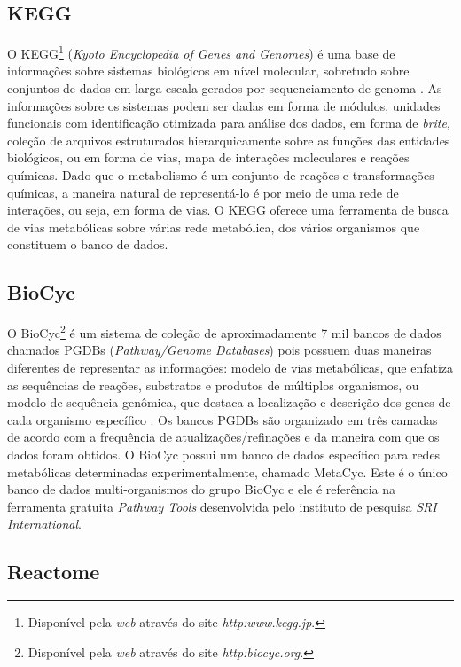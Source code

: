 \subsection{KEGG}

\indent O KEGG\footnote{Disponível pela \textit{web} através do site \textit{http:\/\/www.kegg.jp\/}.} (\textit{Kyoto Encyclopedia of Genes and Genomes}) é uma base de informações sobre sistemas biológicos em nível molecular, sobretudo sobre conjuntos de dados em larga escala gerados por sequenciamento de genoma \cite{keggOverview}. As informações sobre os sistemas podem ser dadas em forma de módulos, unidades funcionais com identificação otimizada para análise dos dados, em forma de \textit{brite}, coleção de arquivos estruturados hierarquicamente sobre as funções das entidades biológicos, ou em forma de vias, mapa de interações moleculares e reações químicas. Dado que o metabolismo é um conjunto de reações e transformações químicas, a maneira natural de representá-lo é por meio de uma rede de interações, ou seja, em forma de vias. O KEGG oferece uma ferramenta de busca de vias metabólicas sobre várias rede metabólica, dos vários organismos que constituem o banco de dados.

\subsection{BioCyc}

\indent O BioCyc\footnote{Disponível pela \textit{web} através do site \textit{http:\/\/biocyc.org}.} é um sistema de coleção de aproximadamente 7 mil bancos de dados chamados PGDBs (\textit{Pathway/Genome Databases}) pois possuem duas maneiras diferentes de representar as informações: modelo de vias metabólicas, que enfatiza as sequências de reações, substratos e produtos de múltiplos organismos, ou modelo de sequência genômica, que destaca a localização e descrição dos genes de cada organismo específico \cite{biocycIntro}. Os bancos PGDBs são organizado em três camadas de acordo com a frequência de atualizações/refinações e da maneira com que os dados foram obtidos. O BioCyc possui um banco de dados específico para redes metabólicas determinadas experimentalmente, chamado MetaCyc. Este é o único banco de dados multi-organismos do grupo BioCyc e ele é referência na ferramenta gratuita \textit{Pathway Tools} desenvolvida pelo instituto de pesquisa \textit{SRI International}.

\subsection{Reactome}

